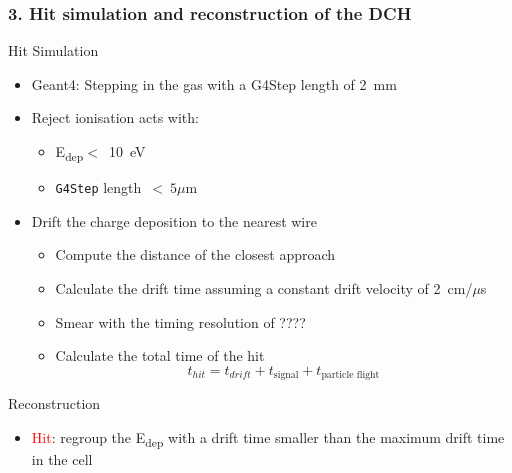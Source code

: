\documentclass[aspectratio=169, hyperref={colorlinks=true,pdfpagelabels=false,linkcolor=black}, xcolor=dvipsnames,10pt]{beamer}
\begin{document}
\begin{frame}
	\frametitle{3. Hit simulation and reconstruction of the DCH }
	
	\begin{block}{Hit Simulation}
	\begin{itemize}
	\item Geant4: Stepping in the gas with a G4Step length of 2~mm 
	\item Reject ionisation acts with:
		\begin{itemize}
		\item E\textsubscript{dep}$<$~10~eV
		\item \texttt{G4Step} length~$<~5\mu$m
		\end{itemize} 
	
	\item Drift the charge deposition to the nearest wire 
		\begin{itemize}
		\item Compute the distance of the closest approach
		\item Calculate the drift time assuming a constant drift velocity of 2~cm/$\mu$s
		\item Smear with the timing resolution of ????
		\item Calculate the total time of the hit \\
		\begin{equation}
	      t_{hit} = t_{drift}+t_{\text{signal}}+t_{\text{particle flight}}
    		\end{equation}
		\end{itemize} 
	\end{itemize}
	\end{block}
		
	\begin{block}{Reconstruction}
		\begin{itemize}
		\item \textcolor{Red}{Hit}: regroup the E\textsubscript{dep} with a drift time smaller than the maximum drift time in the cell
		\end{itemize}
	\end{block}

	
	
\end{frame}
\end{document}
